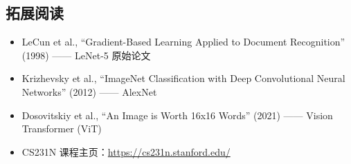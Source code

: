 \documentclass[a4paper]{article}
\begin{document}
\subsection{拓展阅读}

\begin{itemize}
    \item LeCun et al., ``Gradient-Based Learning Applied to Document Recognition'' (1998) —— LeNet-5 原始论文
    \item Krizhevsky et al., ``ImageNet Classification with Deep Convolutional Neural Networks'' (2012) —— AlexNet
    \item Dosovitskiy et al., ``An Image is Worth 16x16 Words'' (2021) —— Vision Transformer (ViT)
    \item CS231N 课程主页：\url{https://cs231n.stanford.edu/}
\end{itemize}
\end{document}
